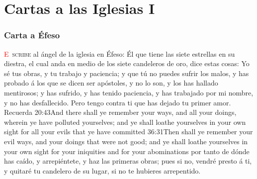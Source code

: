 \chapter{Cartas a las Iglesias I}
\subsection*{Carta a Éfeso}
\lettrine[lines=3]{\textcolor{red}{E}}{\ scribe} al ángel de la iglesia en Éfeso: 
\zz Él que tiene las siete estrellas en su diestra, el cual anda en medio de los siete candeleros de oro, dice estas cosas:%
Yo sé tus obras, y tu trabajo y paciencia; y que tú no puedes sufrir los malos, y has probado á los que se dicen ser apóstoles, y no lo son, y los has hallado mentirosos; %
y has sufrido, y has tenido paciencia, y has trabajado por mi nombre, y no has desfallecido. %
Pero tengo contra ti que has dejado tu primer amor.%
Recuerda%
				{20:43}{And there shall ye remember your ways, and all your doings, wherein ye have polluted yourselves; and ye shall loathe yourselves in your own sight for all your evils that ye have committed}%
				{36:31}{Then shall ye remember your evil ways, and your doings that were not good; and ye shall loathe yourselves in your own sight for your iniquities and for your abominations} %
por tanto de dónde has caído, y arrepiéntete, y haz las primeras obras; pues si no, vendré presto á ti, y quitaré tu candelero de su lugar, si no te hubieres arrepentido. %
